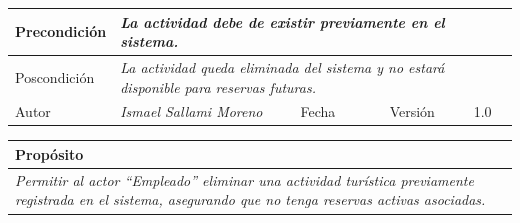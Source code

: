 \begin{table}[H]
\begin{tabular}{llllllll}
        \multicolumn{1}{|l|}{Precondición}                           & \multicolumn{7}{p{10cm}|}{{\color[HTML]{808080} \textit{La actividad debe de existir previamente en el sistema.}}}                                                                                                                                                                                                                                   \\ \hline
        \multicolumn{1}{|l|}{Poscondición}                           & \multicolumn{7}{p{10cm}|}{{\color[HTML]{808080} \textit{La actividad queda eliminada del sistema y no estará disponible para reservas futuras.}}}                                                                                                                                                                                                                                                       \\ \hline
        \multicolumn{1}{|l|}{Autor}                                  & \multicolumn{1}{l|}{{\color[HTML]{808080} \textit{Ismael Sallami Moreno}}}                           & \multicolumn{2}{l|}{Fecha}                                                   & \multicolumn{1}{l|}{}                          & \multicolumn{2}{l|}{Versión}                                                      & \multicolumn{1}{l|}{1.0}                                                     \\ \hline
        \end{tabular}
    \end{table}

    \begin{table}[H]
        \begin{tabular}{llllllll}
        \hline
        \multicolumn{8}{|l|}{\cellcolor[HTML]{F2F2F2}Propósito}                                                                                                                                                                                                                                                                                                                                                                                           \\ \hline
        \multicolumn{8}{|p{15cm}|}{{\color[HTML]{808080} \textit{Permitir al actor “Empleado” eliminar una actividad turística previamente registrada en el sistema, asegurando que no tenga reservas activas asociadas.}}}                                                                                                                                                                                                             \\ \hline
        \end{tabular}
    \end{table}

